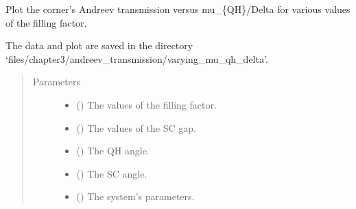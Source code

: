 \documentclass[letterpaper,10pt,english]{sphinxmanual}
\begin{document}

\begin{fulllineitems}
\label{\detokenize{modules:modules.utils.plot_tau_vs_mu_qh_delta_various_fillings}}
\pysigstartsignatures
{}
\pysigstopsignatures
\sphinxAtStartPar
Plot the corner’s Andreev transmission versus mu\_\{QH\}/Delta for various values of the filling factor.

\sphinxAtStartPar
The data and plot are saved in the directory 
‘files/chapter3/andreev\_transmission/varying\_mu\_qh\_delta’.
\begin{quote}\begin{description}
\item[{Parameters}] \leavevmode\begin{itemize}
\item {} 
\sphinxAtStartPar
{} () \textendash{} The values of the filling factor.

\item {} 
\sphinxAtStartPar
{} () \textendash{} The values of the SC gap.

\item {} 
\sphinxAtStartPar
{} () \textendash{} The QH angle.

\item {} 
\sphinxAtStartPar
{} () \textendash{} The SC angle.

\item {} 
\sphinxAtStartPar
{} () \textendash{} The system’s parameters.


\end{itemize}
\end{description}
\end{quote}
\end{fulllineitems}
\end{document}
